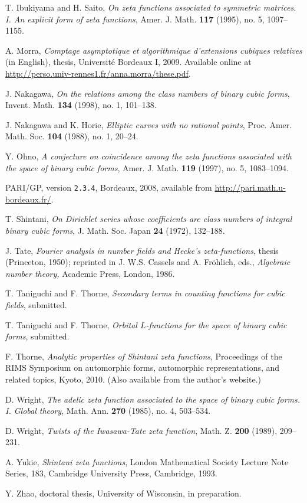 \documentclass[12pt]{amsart}
\theoremstyle{remark}
\numberwithin{theorem}{section} \numberwithin{equation}{section}
\begin{document}
\begin{thebibliography}{99}
 T. Ibukiyama and H. Saito, \emph{On zeta functions associated to symmetric matrices. I. An explicit form of zeta functions},
Amer. J. Math. \textbf{117} (1995), no. 5, 1097--1155. 

 A. Morra,
\emph{Comptage asymptotique et algorithmique d'extensions cubiques relatives} (in English),
thesis, Universit\'e Bordeaux I, 2009. Available online at
\url{http://perso.univ-rennes1.fr/anna.morra/these.pdf}.

 J. Nakagawa, 
\emph{On the relations among the class numbers of binary cubic forms},
Invent. Math. \textbf{134} (1998), no. 1, 101--138. 

 J. Nakagawa and K. Horie,
\emph{Elliptic curves with no rational points},
Proc. Amer. Math. Soc. \textbf{104} (1988), no. 1, 20--24.

 Y. Ohno, 
\emph{A conjecture on coincidence among the zeta functions associated with the space of binary cubic forms},
Amer. J. Math. \textbf{119} (1997), no. 5, 1083--1094. 
 
PARI/GP, version {\tt 2.3.4}, Bordeaux, 2008, available from \url{http://pari.math.u-bordeaux.fr/}.

 T. Shintani,
\emph{On Dirichlet series whose coefficients are class numbers of integral binary cubic forms},
J. Math. Soc. Japan  \textbf{24} (1972), 132--188. 

 J. Tate,
\emph{Fourier analysis in number fields and Hecke's zeta-functions}, thesis (Princeton, 1950); reprinted in
J. W.S. Cassels and A. Fr\"ohlich, eds., 
\emph{Algebraic number theory,}
Academic Press, London, 1986.

 T. Taniguchi and F. Thorne, \emph{Secondary terms in counting functions for cubic fields}, submitted.

 T. Taniguchi and F. Thorne, 
\emph{Orbital $L$-functions for the space of binary cubic forms}, submitted.

 F. Thorne, \emph{Analytic properties of Shintani zeta functions}, 
Proceedings of the RIMS Symposium on automorphic forms, automorphic representations, and related topics, Kyoto, 2010.
(Also available from the author's website.)

 D. Wright,
\emph{The adelic zeta function associated to the space of binary cubic forms. I. Global theory},
Math. Ann.  \textbf{270}  (1985),  no. 4, 503--534.

 D. Wright,
\emph{Twists of the Iwasawa-Tate zeta function}, Math. Z. \textbf{200} (1989), 209--231.

 A. Yukie,
\emph{Shintani zeta functions},
London Mathematical Society Lecture Note Series, 183, Cambridge University Press, Cambridge, 1993.

 Y. Zhao,
doctoral thesis, University of Wisconsin, in preparation.

\end{thebibliography}
\end{document}
